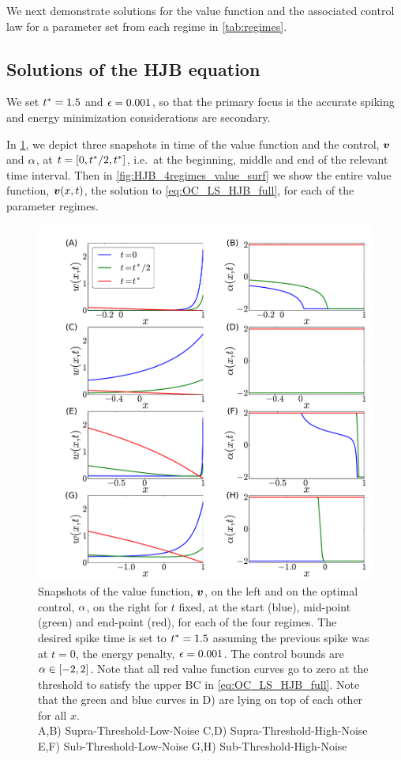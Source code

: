 \documentclass[12pt]{iopart}
\begin{document}
We next demonstrate solutions for the value function and the associated
control law for a parameter set from each regime in \cref{tab:regimes}.

\subsection{Solutions of the HJB equation} 
We set ${ t^* }=1.5$ and ${\epsilon} = 0.001$, so that the primary focus is the accurate
spiking and energy minimization considerations are secondary.

In \cref{fig:HJB_4regimes_value_control_cuts}, we depict three snapshots in time
of the value function and the control, ${ \boldsymbol{v} }$ and ${\alpha}$, at $t = [0,{ t^* }/2, { t^* }]$,
i.e.\ at the beginning, middle and end of the relevant time interval. Then in
\cref{fig:HJB_4regimes_value_surf} we show the entire value function, ${ \boldsymbol{v} }(x,t)$,
the solution to \cref{eq:OC_LS_HJB_full}, for each of the parameter regimes.
\begin{figure}[htp]
\begin{center}
  \includegraphics[width=\textwidth]{Figs/HJB/Regimes_vc_cuts.pdf}
  \caption[labelInTOC]{Snapshots of the value function, ${ \boldsymbol{v} }$, on the left and on
  the optimal control, ${\alpha}$, on the right for $t$ fixed, at the start (blue),
  mid-point (green) and end-point (red), for each of the four regimes.
  The desired spike time is set to ${ t^* }=1.5$ assuming the previous spike was at
  $t=0$, the energy penalty, ${\epsilon} = 0.001$. The control bounds are ${\alpha} \in
  [-2,2]$. 
  Note that all red value function curves go to zero at the threshold to satisfy
  the upper BC in \cref{eq:OC_LS_HJB_full}.
  Note that the green and blue
  curves in D) are lying on top of each other for all $x$.
  \\
  A,B) Supra-Threshold-Low-Noise
  C,D) Supra-Threshold-High-Noise
  E,F) Sub-Threshold-Low-Noise
  G,H) Sub-Threshold-High-Noise
  }
\label{fig:HJB_4regimes_value_control_cuts}
\end{center}
\end{figure}
\end{document}
